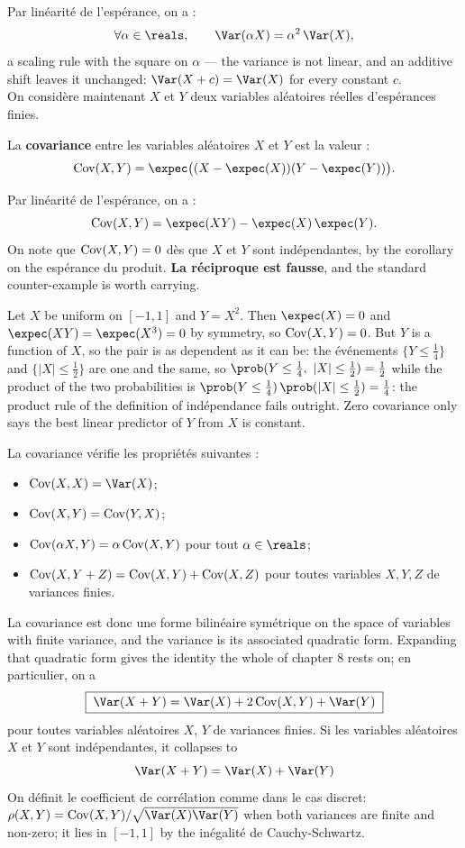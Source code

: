 Par linéarité de l'espérance, on a :
\[
  \forall \alpha \in \reals, \qquad \Var(\alpha X) = \alpha^{2}\,\Var(X),
\]
a scaling rule with the square on $\alpha$ --- the variance is not linear, and an
additive shift leaves it unchanged: $\Var(X+c) = \Var(X)$ for every constant
$c$.\\

On considère maintenant $X$ et $Y$ deux variables aléatoires réelles
d'espérances finies.

\begin{definition}[Covariance]
  La \textbf{covariance} entre les variables aléatoires $X$ et $Y$ est la
  valeur :
  \[
    \Cov(X,Y) = \expec\big((X-\expec(X))(Y-\expec(Y))\big).
  \]
\end{definition}

Par linéarité de l'espérance, on a :
\[
  \Cov(X,Y) = \expec(XY) - \expec(X)\,\expec(Y).
\]
On note que $\operatorname{Cov}(X,Y)=0$ dès que $X$ et $Y$ sont indépendantes, by the corollary
on the espérance du produit. \textbf{La réciproque est fausse}, and the standard
counter-example is worth carrying.

\begin{example}
  Let $X$ be uniform on $[-1,1]$ and $Y = X^{2}$. Then $\expec(X)=0$ and
  $\expec(XY) = \expec(X^{3}) = 0$ by symmetry, so $\operatorname{Cov}(X,Y)=0$. But $Y$ is a
  function of $X$, so the pair is as dependent as it can be: the événements
  $\{Y \leq \tfrac14\}$ and $\{|X| \leq \tfrac12\}$ are one and the same, so
  $\prob(Y \leq \tfrac14,\ |X| \leq \tfrac12) = \tfrac12$ while the product of
  the two probabilities is
  $\prob(Y \leq \tfrac14)\,\prob(|X| \leq \tfrac12) = \tfrac14$: the product rule
  of the definition of indépendance fails outright. Zero covariance only says the
  best linear predictor of $Y$ from $X$ is constant.
\end{example}

La covariance vérifie les propriétés suivantes :
\begin{itemize}
  \item $\Cov(X,X) = \Var(X)$;
  \item $\operatorname{Cov}(X,Y) = \operatorname{Cov}(Y,X)$;
  \item $\operatorname{Cov}(\alpha X, Y) = \alpha \operatorname{Cov}(X,Y)$ pour tout $\alpha \in \reals$;
  \item $\operatorname{Cov}(X, Y+Z) = \operatorname{Cov}(X,Y) + \operatorname{Cov}(X,Z)$ pour toutes variables $X,Y,Z$ de
    variances finies.
\end{itemize}
La covariance est donc une forme bilinéaire symétrique on the space of variables
with finite variance, and the variance is its associated quadratic form.
Expanding that quadratic form gives the identity the whole of chapter 8 rests on;
en particulier, on a
\[
  \boxed{\;\Var(X+Y) = \Var(X) + 2\Cov(X,Y) + \Var(Y)\;}
\]
pour toutes variables aléatoires $X$, $Y$ de variances finies. Si les variables
aléatoires $X$ et $Y$ sont indépendantes, it collapses to
\[
  \Var(X+Y) = \Var(X) + \Var(Y)
\]
On définit le coefficient de corrélation comme dans le cas discret:
$\rho(X,Y) = \Cov(X,Y)/\sqrt{\Var(X)\Var(Y)}$ when both variances are finite and
non-zero; it lies in $[-1,1]$ by the inégalité de Cauchy-Schwartz.

